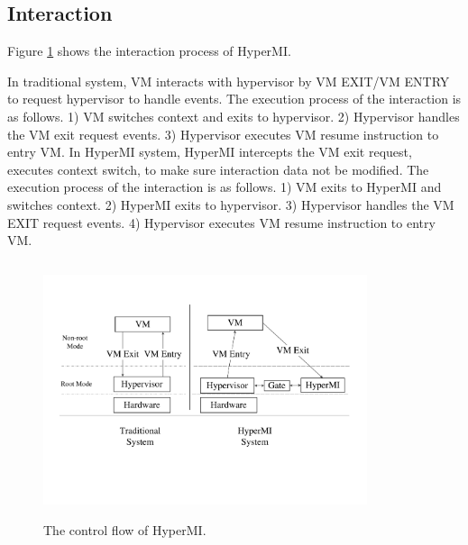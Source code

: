\documentclass[conference]{IEEEtran}
\begin{document}
\subsection{Interaction}



Figure \ref{fig+1} shows the interaction process of HyperMI. 

In traditional system, VM interacts with hypervisor  by VM EXIT/VM ENTRY to request hypervisor to handle events. The execution process of the interaction is as follows. 1) VM switches context and exits to hypervisor. 2) Hypervisor handles the VM exit request events. 3)  Hypervisor executes VM resume instruction to entry VM.
In HyperMI system, HyperMI intercepts the VM exit request, executes context switch, to make sure interaction data not
be modified. The execution process of the interaction is as follows. 1) VM exits to HyperMI and switches context. 2) HyperMI exits to hypervisor. 3) Hypervisor handles the VM EXIT request events. 4) Hypervisor executes VM resume instruction to entry VM.


\begin{figure}
\centerline{\includegraphics[width=9.5cm, height=7.5cm]{pdfvmcsProcess.pdf}}
\caption{The control flow of HyperMI. } \label{fig+1}
\end{figure}
\end{document}
